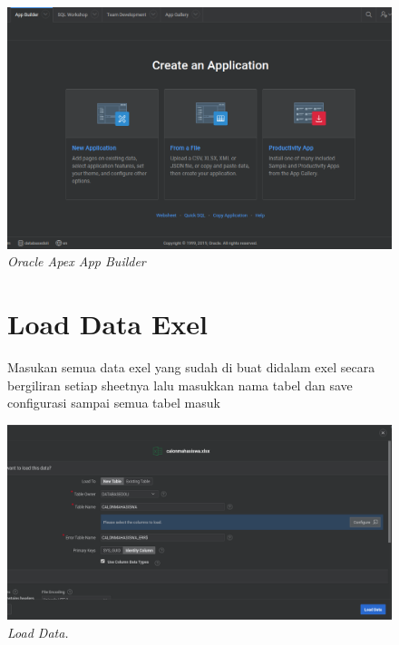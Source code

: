 \begin{enumerate}
\begin{figure}[!htbp]
    \begin{center}
\includegraphics[scale=0.4]{figures/createAppFromfile.png}
    \caption{\textit{Oracle Apex App Builder}}
        \end{center}
\label{gambar}
\end{figure}

\begin{figure}


    \section{Load Data Exel}
    Masukan semua data exel yang sudah di buat didalam exel secara bergiliran
    setiap sheetnya lalu masukkan nama tabel dan save configurasi sampai semua 
    tabel masuk 
    \begin{center}
\includegraphics[scale=0.3]{figures/dataexel.png}
    \caption{\textit{Load Data.}}
        \end{center}
\label{gambar}
\end{figure}




\end{enumerate}
